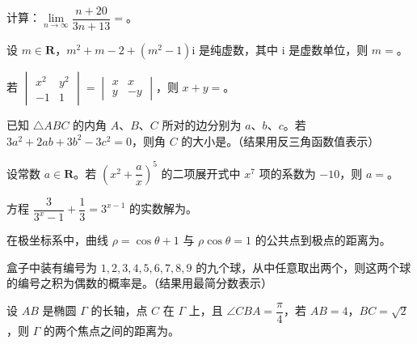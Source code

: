 \begin{question}
计算：$\lim\limits_{n\to\infty}\dfrac{n+20}{3n+13}=$\gkblank{}。

\end{question}
\begin{question}
设 $m\in\mathbf R$，$m^2+m-2+(m^2-1)\mathrm i$ 是纯虚数，其中 $\mathrm i$ 是虚数单位，则 $m=$\gkblank{}。

\end{question}
\begin{question}
若 $\begin{vmatrix}x^2&y^2\\-1&1\end{vmatrix}=\begin{vmatrix}x&x\\y&-y\end{vmatrix}$，则 $x+y=$\gkblank{}。

\end{question}
\begin{question}
已知 $\triangle ABC$ 的内角 $A$、$B$、$C$ 所对的边分别为 $a$、$b$、$c$。若 $3a^2+2ab+3b^2-3c^2=0$，则角 $C$ 的大小是\gkblank{}。（结果用反三角函数值表示）

\end{question}
\begin{question}
设常数 $a\in\mathbf R$。若 $\left(x^2+\dfrac ax\right)^5$ 的二项展开式中 $x^7$ 项的系数为 $-10$，则 $a=$\gkblank{}。

\end{question}
\begin{question}
方程 $\dfrac{3}{3^x-1}+\dfrac13=3^{x-1}$ 的实数解为\gkblank{}。

\end{question}
\begin{question}
在极坐标系中，曲线 $\rho=\cos\theta+1$ 与 $\rho\cos\theta=1$ 的公共点到极点的距离为\gkblank{}。

\end{question}
\begin{question}
盒子中装有编号为 $1,2,3,4,5,6,7,8,9$ 的九个球，从中任意取出两个，则这两个球的编号之积为偶数的概率是\gkblank{}。（结果用最简分数表示）

\end{question}
\begin{question}
设 $AB$ 是椭圆 $\Gamma$ 的长轴，点 $C$ 在 $\Gamma$ 上，且 $\angle CBA=\dfrac{\pi}{4}$，若 $AB=4$，$BC=\sqrt2$，则 $\Gamma$ 的两个焦点之间的距离为\gkblank{}。

\end{question}
